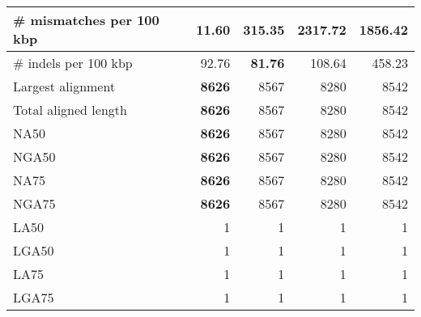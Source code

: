 \documentclass[12pt,a4paper]{article}
\begin{document}
\begin{table}[ht]
\begin{center}
\begin{tabular}{|l*{4}{|r}|}
\# mismatches per 100 kbp & {\bf 11.60} & 315.35 & 2317.72 & 1856.42 \\ \hline
\# indels per 100 kbp & 92.76 & {\bf 81.76} & 108.64 & 458.23 \\ \hline
Largest alignment & {\bf 8626} & 8567 & 8280 & 8542 \\ \hline
Total aligned length & {\bf 8626} & 8567 & 8280 & 8542 \\ \hline
NA50 & {\bf 8626} & 8567 & 8280 & 8542 \\ \hline
NGA50 & {\bf 8626} & 8567 & 8280 & 8542 \\ \hline
NA75 & {\bf 8626} & 8567 & 8280 & 8542 \\ \hline
NGA75 & {\bf 8626} & 8567 & 8280 & 8542 \\ \hline
LA50 & 1 & 1 & 1 & 1 \\ \hline
LGA50 & 1 & 1 & 1 & 1 \\ \hline
LA75 & 1 & 1 & 1 & 1 \\ \hline
LGA75 & 1 & 1 & 1 & 1 \\ \hline
\end{tabular}
\end{center}
\end{table}
\end{document}
